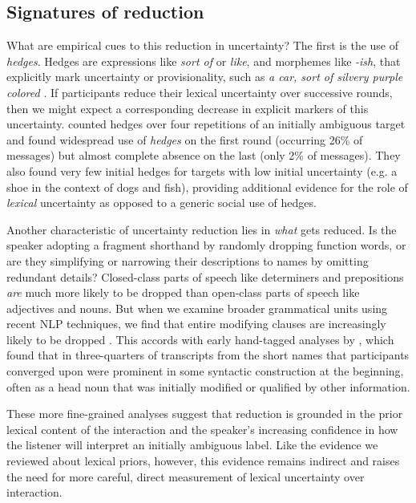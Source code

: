 \subsection{Signatures of reduction}

What are empirical cues to this reduction in uncertainty? The first is the use of \emph{hedges}. Hedges are expressions like \emph{sort of} or \emph{like}, and morphemes like \emph{-ish}, that explicitly mark uncertainty or provisionality, such as \emph{a car, sort of silvery purple colored} \cite{BrennanClark96_ConceptualPactsConversation,Fraser10_Hedging,MedlockBriscoe07_HedgeClassification}. If participants reduce their lexical uncertainty over successive rounds, then we might expect a corresponding decrease in explicit markers of this uncertainty.  counted hedges over four repetitions of an initially ambiguous target and found widespread use of \emph{hedges} on the first round (occurring 26\% of messages) but almost complete absence on the last (only 2\% of messages). They also found very few initial hedges for targets with low initial uncertainty (e.g. a shoe in the context of dogs and fish), providing additional evidence for the role of \emph{lexical} uncertainty as opposed to a generic social use of hedges.

Another characteristic of uncertainty reduction lies in \emph{what} gets reduced. Is the speaker adopting a fragment shorthand by randomly dropping function words, or are they simplifying or narrowing their descriptions to names by omitting redundant details? Closed-class parts of speech like determiners and prepositions \emph{are} much more likely to be dropped than open-class parts of speech like adjectives and nouns. But when we examine broader grammatical units using recent NLP techniques, we find that entire modifying clauses are increasingly likely to be dropped \cite{HawkinsFrankGoodman17_ConventionFormation}. This accords with early hand-tagged analyses by , which found that in three-quarters of transcripts from  the short names that participants converged upon were prominent in some syntactic construction at the beginning, often as a head noun that was initially modified or qualified by other information. 


These more fine-grained analyses suggest that reduction is grounded in the prior lexical content of the interaction and the speaker's increasing confidence in how the listener will interpret an initially ambiguous label. Like the evidence we reviewed about lexical priors, however, this evidence remains indirect and raises the need for more careful, direct measurement of lexical uncertainty over interaction. 

